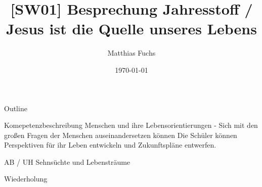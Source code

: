 \documentclass[pdftex,a4paper,12pt,bibliography=totoc,draft]{scrartcl}
\author{Matthias Fuchs}
\date{\today}
\title{[SW01] Besprechung Jahresstoff / Jesus ist die Quelle unseres Lebens}
\begin{document}
\maketitle
\begin{frame}{Outline}
\tableofcontents
\end{frame}

\begin{frame}[label={sec:org562ea8a}]{Komepetenzbeschreibung}
Menschen und ihre Lebensorientierungen - Sich mit den großen Fragen der Menschen auseinandersetzen können
Die Schüler können Perspektiven für ihr Leben entwickeln und  Zukunftspläne entwerfen. 
\end{frame}

\begin{frame}[label={sec:org172b6dd}]{AB / UH}
Sehnsüchte und Lebensträume
\end{frame}

\begin{frame}[label={sec:orga843ed7}]{Wiederholung}
\end{frame}
\end{document}
